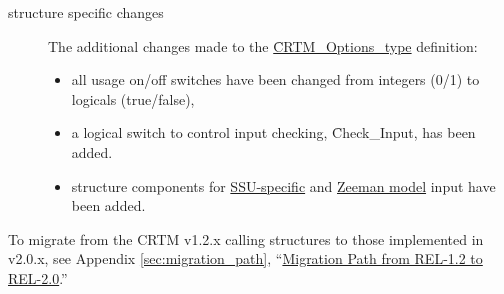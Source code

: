 \begin{description}
\item[\Options{} structure specific changes] The additional changes made to the \hyperref[sec:options_structure]{\f{CRTM\_Options\_type}} definition:
  \begin{itemize}
  \item all usage on/off switches have been changed from integers (0/1) to logicals (true/false),
  \item a logical switch to control input checking, \f{Check\_Input}, has been added.
  \item structure components for \hyperref[sec:ssu_input_structure]{SSU-specific} and \hyperref[sec:zeeman_input_structure]{Zeeman model} input have been added.
  \end{itemize}
\end{description}

To migrate from the CRTM v1.2.x calling structures to those implemented in v2.0.x, see Appendix \ref{sec:migration_path}, ``\hyperref[sec:migration_path]{Migration Path from REL-1.2 to REL-2.0}.''
